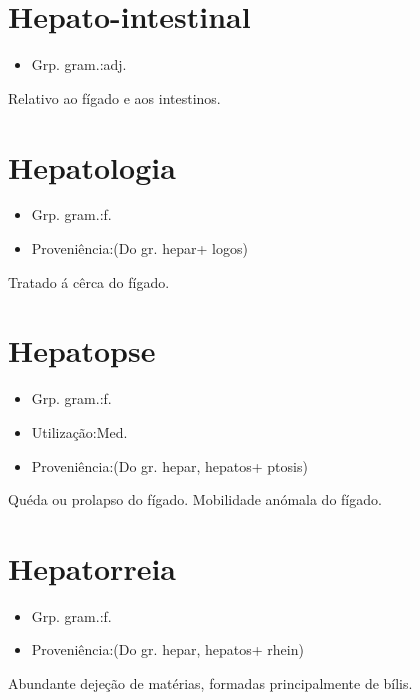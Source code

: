 \documentclass{article}
\begin{document}
\section{Hepato-intestinal}
\begin{itemize}
\item {Grp. gram.:adj.}
\end{itemize}
Relativo ao fígado e aos intestinos.
\section{Hepatologia}
\begin{itemize}
\item {Grp. gram.:f.}
\end{itemize}
\begin{itemize}
\item {Proveniência:(Do gr. \textunderscore hepar\textunderscore  + \textunderscore logos\textunderscore )}
\end{itemize}
Tratado á cêrca do fígado.
\section{Hepatopse}
\begin{itemize}
\item {Grp. gram.:f.}
\end{itemize}
\begin{itemize}
\item {Utilização:Med.}
\end{itemize}
\begin{itemize}
\item {Proveniência:(Do gr. \textunderscore hepar\textunderscore , \textunderscore hepatos\textunderscore  + \textunderscore ptosis\textunderscore )}
\end{itemize}
Quéda ou prolapso do fígado.
Mobilidade anómala do fígado.
\section{Hepatorreia}
\begin{itemize}
\item {Grp. gram.:f.}
\end{itemize}
\begin{itemize}
\item {Proveniência:(Do gr. \textunderscore hepar\textunderscore , \textunderscore hepatos\textunderscore  + \textunderscore rhein\textunderscore )}
\end{itemize}
Abundante dejeção de matérias, formadas principalmente de bílis.
\end{document}
